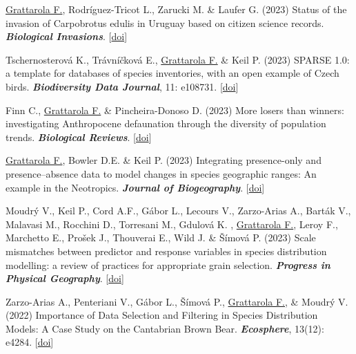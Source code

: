 \documentclass[9pt]{developercv} %
\begin{document}


\begin{etaremune}

\item \underline{Grattarola F.}, Rodríguez-Tricot L., Zarucki M. \& Laufer G. (2023) Status of the invasion of Carpobrotus edulis in Uruguay based on citizen science records. \textit{\textbf{Biological Invasions}}. [\href{https://doi.org/10.1007/s10530-023-03242-w}{doi}]

\item Tschernosterová K., Trávníčková E., \underline{Grattarola F.} \& Keil P. (2023) SPARSE 1.0: a template for databases of species inventories, with an open example of Czech birds. \textit{\textbf{Biodiversity Data Journal}}, 11: e108731. [\href{https://doi.org/10.3897/BDJ.11.e108731}{doi}]

\item Finn C., \underline{Grattarola F.}  \& Pincheira-Donoso D. (2023) More losers than winners: investigating Anthropocene defaunation through the diversity of population trends. \textit{\textbf{Biological Reviews}}. [\href{https://doi.org/10.1111/brv.12974}{doi}]

\item \underline{Grattarola F.}, Bowler D.E. \& Keil P. (2023) Integrating presence-only and presence–absence data to model changes in species geographic ranges: An example in the Neotropics. \textit{\textbf{Journal of Biogeography}}. [\href{https://doi.org/10.1111/jbi.14622}{doi}]

\item Moudrý V., Keil P., Cord A.F., Gábor L., Lecours V., Zarzo-Arias A., Barták V.,  Malavasi M., Rocchini D., Torresani M., Gdulová K. , \underline{Grattarola F.}, Leroy F., Marchetto E., Prošek J., Thouverai E., Wild J.  \& Šímová P. (2023) Scale mismatches between predictor and response variables in species distribution modelling: a review of practices for appropriate grain selection. \textit{\textbf{Progress in Physical Geography}}. [\href{https://doi.org/10.1177/03091333231156362}{doi}]

\item Zarzo-Arias A., Penteriani V.,  Gábor L., Šímová P.,  \underline{Grattarola F.}, \& Moudrý V. (2022) Importance of Data Selection and Filtering in Species Distribution Models: A Case Study on the Cantabrian Brown Bear. \textit{\textbf{Ecosphere}}, 13(12): e4284. [\href{https://doi.org/10.1002/ecs2.4284}{doi}]


\end{etaremune}
\end{document}
